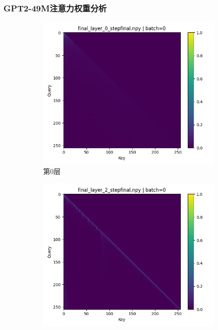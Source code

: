 \documentclass{article}
\begin{document}
\subsubsection{GPT2-49M注意力权重分析}
\begin{figure}[H]
\centering
\begin{subfigure}[b]{0.3\textwidth}
\includegraphics[width=\textwidth]{../visualize/attentions/GPT2-49M/final_layer_0_stepfinal_b0.png}
\caption{第0层}
\label{fig:attn_49m_l0_b0}
\end{subfigure}
\hfill
\begin{subfigure}[b]{0.3\textwidth}
\includegraphics[width=\textwidth]{../visualize/attentions/GPT2-49M/final_layer_2_stepfinal_b0.png}

\end{subfigure}
\end{figure}
\end{document}
